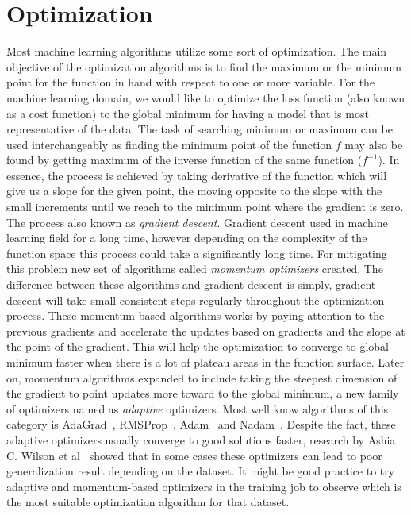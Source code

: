 \section{Optimization} \label{sec:optimization}
Most machine learning algorithms utilize some sort of optimization. 
The main objective of the optimization algorithms is to find the maximum or the minimum point for the function in hand with respect to one or more variable. 
For the machine learning domain, we would like to optimize the loss function (also known as a cost function) to the global minimum for having a model that is most representative of the data.
The task of searching minimum or maximum can be used interchangeably as finding the minimum point of the function $f$ may also be found by getting maximum of the inverse function of the same function ($f^{-1}$).
In essence, the process is achieved by taking derivative of the function which will give us a slope for the given point, the moving opposite to the slope with the small increments until we reach to the minimum point where the gradient is zero.
The process also known as \emph{gradient descent}.
Gradient descent used in machine learning field for a long time, however depending on the complexity of the function space this process could take a significantly long time. 
For mitigating this problem new set of algorithms called \emph{momentum optimizers} created.
The difference between these algorithms and gradient descent is simply, gradient descent will take small consistent steps regularly throughout the optimization process. 
These momentum-based algorithms works by paying attention to the previous gradients and accelerate the updates based on gradients and the slope at the point of the gradient.
This will help the optimization to converge to global minimum faster when there is a lot of plateau areas in the function surface.
Later on, momentum algorithms expanded to include taking the steepest dimension of the gradient to point updates more toward to the global minimum, a new family of optimizers named as \emph{adaptive} optimizers. 
Most well know algorithms of this category is AdaGrad~\cite{adagrad}, RMSProp~\cite{rmsprop}, Adam~\cite{adam} and Nadam~\cite{nadam}.
Despite the fact, these adaptive optimizers usually converge to good solutions faster, research by Ashia C. Wilson et al~\cite{optimize-ashia} showed that in some cases these optimizers can lead to poor generalization result depending on the dataset.
It might be good practice to try adaptive and momentum-based optimizers in the training job to observe which is the most suitable optimization algorithm for that dataset.


